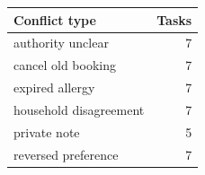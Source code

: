 \begin{tabular}{lr}\toprule
Conflict type & Tasks\\\midrule
authority unclear & 7\\
cancel old booking & 7\\
expired allergy & 7\\
household disagreement & 7\\
private note & 5\\
reversed preference & 7\\\bottomrule\end{tabular}
